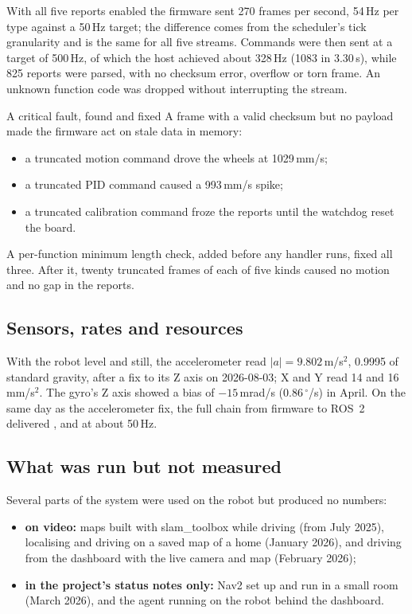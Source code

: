 \documentclass[11pt]{article}
\begin{document}
With all five reports enabled the firmware sent 270 frames per second, 54\,Hz per type against a 50\,Hz target; the difference comes from the scheduler's tick granularity and is the same for all five streams. Commands were then sent at a target of 500\,Hz, of which the host achieved about 328\,Hz (1083 in 3.30\,s), while 825 reports were parsed, with no checksum error, overflow or torn frame. An unknown function code was dropped without interrupting the stream.

\begin{summarybox}{A critical fault, found and fixed}
A frame with a valid checksum but no payload made the firmware act on stale data in memory:
\begin{itemize}
  \item a truncated motion command drove the wheels at 1029\,mm/s;
  \item a truncated PID command caused a 993\,mm/s spike;
  \item a truncated calibration command froze the reports until the watchdog reset the board.
\end{itemize}
A per-function minimum length check, added before any handler runs, fixed all three. After it, twenty truncated frames of each of five kinds caused no motion and no gap in the reports.
\end{summarybox}

\subsection{Sensors, rates and resources}

With the robot level and still, the accelerometer read $|a| = 9.802$\,m/s$^2$, 0.9995 of standard gravity, after a fix to its Z axis on 2026-08-03; X and Y read 14 and 16\,mm/s$^2$. The gyro's Z axis showed a bias of $-15$\,mrad/s (0.86\,$^\circ$/s) in April. On the same day as the accelerometer fix, the full chain from firmware to ROS~2 delivered ,  and  at about 50\,Hz.

\subsection{What was run but not measured}

Several parts of the system were used on the robot but produced no numbers:

\begin{itemize}
  \item \textbf{on video:} maps built with slam\_toolbox while driving (from July 2025), localising and driving on a saved map of a home (January 2026), and driving from the dashboard with the live camera and map (February 2026);
  \item \textbf{in the project's status notes only:} Nav2 set up and run in a small room (March 2026), and the agent running on the robot behind the dashboard.
\end{itemize}
\end{document}
